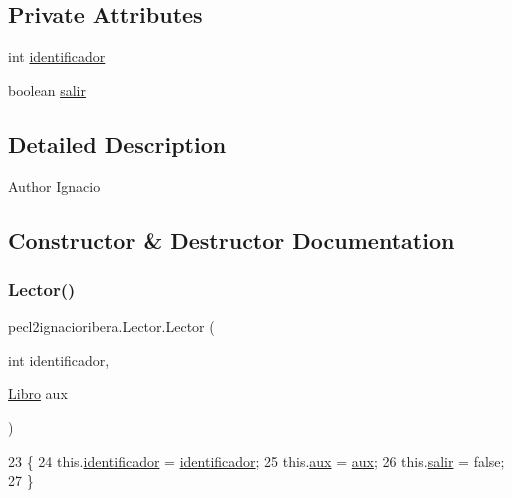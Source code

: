 \subsection*{Private Attributes}
\begin{DoxyCompactItemize}
\item 
int \mbox{\hyperlink{classpecl2ignacioribera_1_1_lector_a5ac527a198591eefd058ee83f6f0837e}{identificador}}
\item 
boolean \mbox{\hyperlink{classpecl2ignacioribera_1_1_lector_a74648948a44c99203ad02aa50e9df5dc}{salir}}
\end{DoxyCompactItemize}


\subsection{Detailed Description}
\begin{DoxyAuthor}{Author}
Ignacio 
\end{DoxyAuthor}


\subsection{Constructor \& Destructor Documentation}
\mbox{\label{classpecl2ignacioribera_1_1_lector_ac4d5e23d8071e1ccb0675838b0c23bee}} 
\subsubsection{\texorpdfstring{Lector()}{Lector()}}
{\footnotesize\ttfamily pecl2ignacioribera.\+Lector.\+Lector (\begin{DoxyParamCaption}\item[{int}]{identificador,  }\item[{\mbox{\hyperlink{classpecl2ignacioribera_1_1_libro}{Libro}}}]{aux }\end{DoxyParamCaption})\hspace{0.3cm}{\ttfamily [inline]}}


\begin{DoxyCode}
23      \{
24          this.\mbox{\hyperlink{classpecl2ignacioribera_1_1_lector_a5ac527a198591eefd058ee83f6f0837e}{identificador}} = \mbox{\hyperlink{classpecl2ignacioribera_1_1_lector_a5ac527a198591eefd058ee83f6f0837e}{identificador}};
25          this.\mbox{\hyperlink{classpecl2ignacioribera_1_1_lector_a6036872628f80d526e0d2dc874811b36}{aux}} = \mbox{\hyperlink{classpecl2ignacioribera_1_1_lector_a6036872628f80d526e0d2dc874811b36}{aux}};
26          this.\mbox{\hyperlink{classpecl2ignacioribera_1_1_lector_a74648948a44c99203ad02aa50e9df5dc}{salir}} = \textcolor{keyword}{false};
27      \}
\end{DoxyCode}


